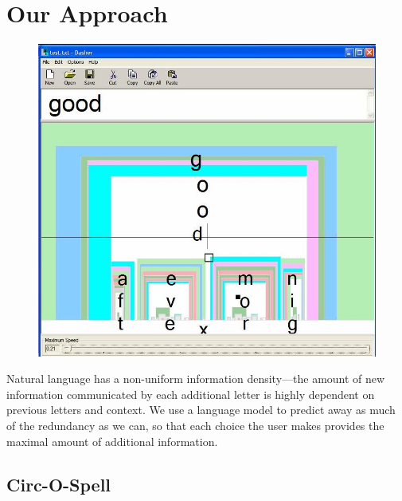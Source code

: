 \documentclass[12pt,titlepage]{article}
\begin{document}
\section{Our Approach}

\begin{figure}[t]
\begin{center}
	\includegraphics[scale=0.25]{figure4.jpeg}
	\label{fig:Dash}
\end{center}
\end{figure}

Natural language has a non-uniform information density---the amount of new information 
communicated by each additional letter is highly dependent on previous letters and context. 
We use a language model to predict away as much of the redundancy as we can, so that each 
choice the user makes provides the maximal amount of additional information.

\subsection{Circ-O-Spell}
\end{document}
